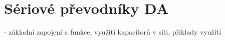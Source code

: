 \section{Sériové převodníky DA}
- základní zapojení a funkce, využití kapacitorů v síti, příklady využití